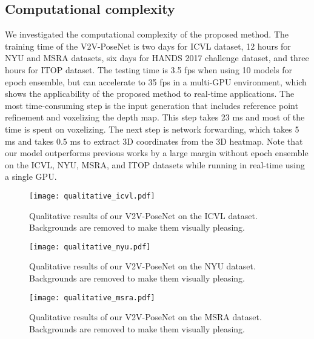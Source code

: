 \documentclass[10pt,twocolumn,letterpaper]{article}
\begin{document}
\subsection{Computational complexity}
We investigated the computational complexity of the proposed method. The training time of the V2V-PoseNet is two days for ICVL dataset, 12 hours for NYU and MSRA datasets, six days for HANDS 2017 challenge dataset, and three hours for ITOP dataset. The testing time is 3.5 fps when using 10 models for epoch ensemble, but can accelerate to 35 fps in a multi-GPU environment, which shows the applicability of the proposed method to real-time applications. The most time-consuming step is the input generation that includes reference point refinement and voxelizing the depth map. This step takes 23 ms and most of the time is spent on voxelizing. The next step is network forwarding, which takes 5 ms and takes 0.5 ms to extract 3D coordinates from the 3D heatmap. Note that our model outperforms previous works by a large margin without epoch ensemble on the ICVL, NYU, MSRA, and ITOP datasets while running in real-time using a single GPU.


\begin{figure*}
\begin{center}
   \texttt{[image: qualitative\_icvl.pdf]}
\end{center}
\vspace*{-6mm}
   \caption{Qualitative results of our V2V-PoseNet on the ICVL dataset. Backgrounds are removed to make them visually pleasing.}
\vspace*{-3mm}
\label{fig:qualitative_icvl}
\end{figure*}

\begin{figure*}
\begin{center}
   \texttt{[image: qualitative\_nyu.pdf]}
\end{center}
\vspace*{-6mm}
   \caption{Qualitative results of our V2V-PoseNet on the NYU dataset. Backgrounds are removed to make them visually pleasing.}
\vspace*{-3mm}
\label{fig:qualitative_nyu}
\end{figure*}

\begin{figure*}
\begin{center}
   \texttt{[image: qualitative\_msra.pdf]}
\end{center}
\vspace*{-6mm}
   \caption{Qualitative results of our V2V-PoseNet on the MSRA dataset. Backgrounds are removed to make them visually pleasing.}
\vspace*{-3mm}
\label{fig:qualitative_msra}
\end{figure*}
\end{document}
